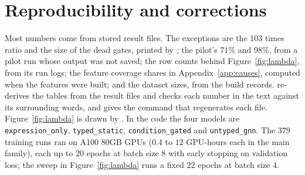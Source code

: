 \documentclass{article}
\begin{document}
\section{Reproducibility and corrections}
\label{app:repro}

Most numbers come from stored result files. The exceptions are the $103$ times ratio and the size of the
dead gates, printed by ; the pilot's $71\%$ and $98\%$,
from a pilot run whose output was not saved; the row counts behind Figure~\ref{fig:lambda}, from its run
logs; the feature coverage shares in Appendix~\ref{app:causes}, computed when the features were built;
and the dataset sizes, from the build records.  re-derives the tables from the
result files and checks each number in the text against its surrounding words, and
 gives the command that regenerates each file. Figure~\ref{fig:lambda} is drawn
by . In the code the four models are \texttt{expression\_only},
\texttt{typed\_static}, \texttt{condition\_gated} and \texttt{untyped\_gnn}. The $379$ training runs ran on
A100 80GB GPUs ($0.4$ to $12$ GPU-hours each in the main family), each up to $20$ epochs at batch size $8$
with early stopping on validation loss; the sweep in Figure~\ref{fig:lambda} runs a fixed $22$ epochs at
batch size $4$.
\end{document}

